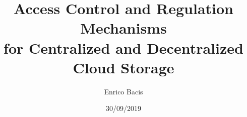 \documentclass{article}
\begin{document}
\title{Access Control and Regulation Mechanisms\\ for Centralized and Decentralized Cloud Storage}
\author{Enrico Bacis}
\date{30/09/2019}

\maketitle

\vspace{40px}
\end{document}
